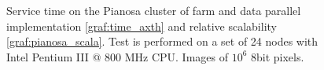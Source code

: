 \begin{figure}[p]
\centering
{}
\caption{ Service time on the Pianosa cluster of farm and data parallel implementation \ref{graf:time_axth} and relative scalability \ref{graf:pianosa_scala}.  Test is performed on a set of 24 nodes with Intel Pentium III @ 800 MHz CPU. Images of $10^6$ 8bit pixels.}
\label{chart:pianosa_comm}
\end{figure}

